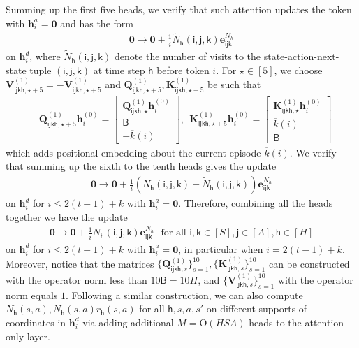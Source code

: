 \documentclass[10pt]{article}
\renewcommand{\bar}{\overline}
\newcommand{\<}{\left\langle}
\renewcommand{\>}{\right\rangle}
\renewcommand{\bQ}{\mathbf{Q}}
\newcommand{\bzero}{{\mathbf 0}}
\newcommand{\parta}{{a}}
\newcommand{\partd}{{d}}
\newcommand{\state}{{s}}
\newcommand{\action}{{a}}
\newcommand{\reward}{{r}}
\newcommand{\horizon}{{H}}
\renewcommand{\horizon}{{H}}
\newcommand{\head}{{M}}
\newcommand{\tfthres}{{\mathsf{B}}}
\newcommand{\Numst}{{S}}
\newcommand{\Numact}{{A}}
\newcommand{\Numvi}{{N}}
\newcommand{\conO}{{\mathrm{O}}}
\def\bK{{\mathbf K}}
\def\bQ{{\mathbf Q}}
\def\bV{{\mathbf V}}
\def\be{{\mathbf e}}
\def\bh{{\mathbf h}}
\def\si{{\mathsf{i}}}
\def\sj{{\mathsf{j}}}
\def\sk{{\mathsf{k}}}
\def\sh{{\mathsf{h}}}
\begin{document}
Summing up the first five heads, we verify that such attention updates the token with $\bh_i^\parta=\bzero$ and has the form
\begin{align*}
\bzero\rightarrow\bzero+\frac1i\widetilde{\Numvi}_\sh(\si,\sj,\sk)\be_{\si\sj\sk}^{\Numvi_h}
\end{align*} on  $\bh^\partd_i$, where $\widetilde{\Numvi}_\sh(\si,\sj,\sk)$ denote the number of visits to the state-action-next-state tuple $(\si,\sj,\sk)$ at time step $\sh$ before token $i$. For $\star\in[5]$, we choose $\bV^{(1)}_{\si\sj\sk\sh,\star+5}=-\bV^{(1)}_{\si\sj\sk\sh,\star+5}$ and $\bQ^{(1)}_{\si\sj\sk\sh,\star+5},\bK^{(1)}_{\si\sj\sk\sh,\star+5}$ be such that
\begin{align*}
&\bQ^{(1)}_{\si\sj\sk\sh,\star+5}\bh^{(0)}_{i}=
\begin{bmatrix}
\bQ^{(1)}_{\si\sj\sk\sh,\star}\bh^{(0)}_{i}\\
\tfthres\\
-\bar{k}(i)
    \end{bmatrix},~~ \bK^{(1)}_{\si\sj\sk\sh,\star+5}\bh^{(0)}_{i}=\begin{bmatrix}
\bK^{(1)}_{\si\sj\sk\sh,\star}\bh^{(0)}_{i}\\ \bar{k}(i)\\\tfthres
\end{bmatrix}
\end{align*} which adds positional embedding about the current episode $\bar{k}(i)$. We verify that summing up the sixth to the tenth heads gives the update  \begin{align*}
\bzero\rightarrow\bzero+\frac{1}{i}({\Numvi}_\sh(\si,\sj,\sk)-\widetilde{\Numvi}_\sh(\si,\sj,\sk))\be_{\si\sj\sk}^{\Numvi_h}
\end{align*} on  $\bh^\partd_i$ for $i\leq 2(t-1)+k$ with $\bh_i^\parta=\bzero$. Therefore, combining all the heads together we have the update
\begin{align*}
\bzero\rightarrow\bzero+\frac{1}{i}{\Numvi}_\sh(\si,\sj,\sk)\be_{\si\sj\sk}^{\Numvi_h}\text{~~for all~}\si,\sk\in[\Numst],\sj\in[\Numact],\sh\in[\horizon]
\end{align*} on $\bh^\partd_i$ for $i\leq 2(t-1)+k$ with $\bh_i^\parta=\bzero$, in particular when $i=2(t-1)+k$. Moreover,  notice that the matrices $\{\bQ^{(1)}_{\si\sj\sk\sh,s}\}_{s=1}^{10},\{\bK^{(1)}_{\si\sj\sk\sh,s}\}_{s=1}^{10}$ can be constructed with the operator norm less than $10\tfthres=10\horizon$, and $\{\bV^{(1)}_{\si\sj\sk\sh,s}\}_{s=1}^{10}$ with the operator norm equals $1$.
Following a similar construction, we can also compute $\Numvi_\sh(\state,\action),\Numvi_\sh(\state,\action)\reward_\sh(\state,\action)$ for all $\sh,\state,\action,\state'$ on different supports of coordinates in $\bh_i^\partd$ via adding additional $\head=\conO(\horizon\Numst\Numact)$ heads to the attention-only layer.
\end{document}
